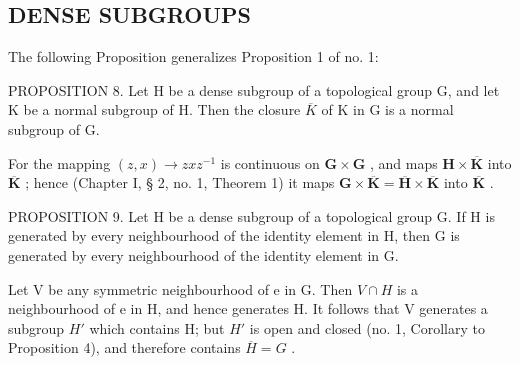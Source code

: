 \subsection{DENSE SUBGROUPS}

The following Proposition generalizes Proposition 1 of no. 1:

PROPOSITION 8. Let H be a dense subgroup of a topological group G, and let K be a normal subgroup of H. Then the closure \(\overline{K}\) of K in G is a normal subgroup of G.

For the mapping \((z, x) \to zxz^{-1}\) is continuous on \(\mathbf{G} \times \mathbf{G}\) , and maps \(\mathbf{H} \times \overline{\mathbf{K}}\) into \(\overline{\mathbf{K}}\) ; hence (Chapter I, § 2, no. 1, Theorem 1) it maps \(\mathbf{G} \times \overline{\mathbf{K}} = \overline{\mathbf{H}} \times \overline{\mathbf{K}}\) into \(\overline{\mathbf{K}}\) .

PROPOSITION 9. Let H be a dense subgroup of a topological group G. If H is generated by every neighbourhood of the identity element in H, then G is generated by every neighbourhood of the identity element in G.

Let V be any symmetric neighbourhood of e in G. Then \(V \cap H\) is a neighbourhood of e in H, and hence generates H. It follows that V generates a subgroup \(H'\) which contains H; but \(H'\) is open and closed (no. 1, Corollary to Proposition 4), and therefore contains \(\overline{H} = G\) .

